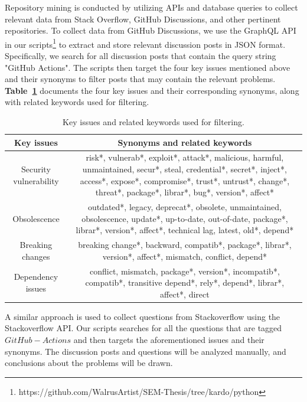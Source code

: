 \documentclass[conference]{IEEEtran}
\begin{document}
             Repository mining is conducted by utilizing APIs and database queries to collect relevant data from Stack Overflow, GitHub Discussions, and other pertinent repositories. To collect data from GitHub Discussions, we use the GraphQL API in our scripts\footnote{https://github.com/WalrusArtist/SEM-Thesis/tree/kardo/python} to extract and store relevant discussion posts in JSON format. Specifically, we search for all discussion posts that contain the query string "GitHub Actions". The scripts then target the four key issues mentioned above and their synonyms to filter posts that may contain the relevant problems. \textbf{Table~\ref{tab:related_keywords}} documents the four key issues and their corresponding synonyms, along with related keywords used for filtering. \\
  \begin{table}[H]
          \centering
          \caption{Key issues and related keywords used for filtering.}
          \label{tab:related_keywords}
	\hspace{5cm}
          \begin{tabular}{|c|c|}
              \hline
              \textbf{Key issues} & \textbf{Synonyms and related keywords} \\
              \hline
              Security vulnerability & \parbox[t]{5.5cm}{risk*, vulnerab*, exploit*, attack*, malicious, harmful, unmaintained, secur*, steal, credential*, secret*, inject*, access*, expose*, compromise*, trust*, untrust*, change*, threat*, package*, librar*, bug*,  version*, affect*\\}  \\
             \hline
             Obsolescence & \parbox[t]{5.5cm}{outdated*, legacy, deprecat*, obsolete, unmaintained, obsolescence, update*, up-to-date, out-of-date, package*, librar*, version*, affect*, technical lag, latest, old*, depend*\\}  \\
              \hline
              Breaking changes & \parbox[t]{5.5cm}{breaking change*,  backward, compatib*, package*, librar*, version*, affect*, mismatch, conflict, depend*\\} \\
              \hline
              Dependency issues &  \parbox[t]{5.5cm}{conflict, mismatch, package*, version*, incompatib*, compatib*, transitive depend*, rely*, depend*, librar*, affect*, direct\\}  \\
              \hline
          \end{tabular}
\end{table}
                A similar approach is used to collect questions from Stackoverflow using the Stackoverflow API. Our scripts searches for all the questions that are tagged $GitHub-Actions$ and then targets the aforementioned issues and their synonyms. The discussion posts and questions will be analyzed manually, and conclusions about the problems will be drawn.\\
\end{document}
